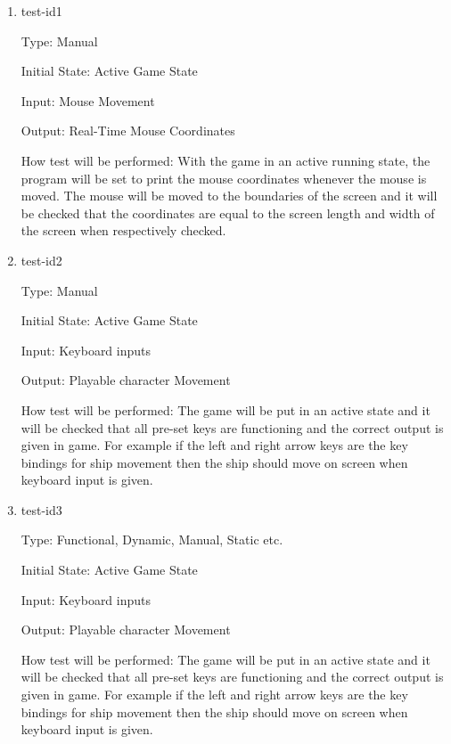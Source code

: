 \documentclass[12pt, titlepage]{article}
\begin{document}
\begin{enumerate}

\item{test-id1\\}

Type: Manual 
					
Initial State: Active Game State 
					
Input: Mouse Movement 
					
Output: Real-Time Mouse Coordinates 
					
How test will be performed: With the game in an active running state, the program will be set to print the mouse coordinates whenever the mouse is moved. The mouse will be moved to the boundaries of the screen and it will be checked that the coordinates are equal to the screen length and width of the screen when respectively checked.  
					
\item{test-id2\\}

Type: Manual 
					
Initial State: Active Game State 
					
Input: Keyboard inputs
					
Output: Playable character Movement
					
How test will be performed: The game will be put in an active state and it will be checked that all pre-set keys are functioning and the correct output is given in game. For example if the left and right arrow keys are the key bindings for ship movement then the ship should move on screen when keyboard input is given. 


\item{test-id3\\}

Type: Functional, Dynamic, Manual, Static etc.
					
Initial State: Active Game State 
					
Input: Keyboard inputs
					
Output: Playable character Movement
					
How test will be performed: The game will be put in an active state and it will be checked that all pre-set keys are functioning and the correct output is given in game. For example if the left and right arrow keys are the key bindings for ship movement then the ship should move on screen when keyboard input is given. 

\end{enumerate}
\end{document}
